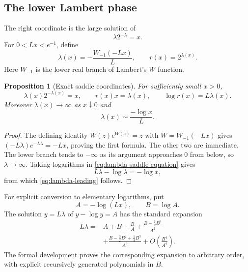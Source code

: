 \documentclass[11pt,oneside]{article}
\newtheorem{proposition}[theorem]{Proposition}
\theoremstyle{definition}
\theoremstyle{remark}
\newcommand{\Lam}{\lambda}
\newcommand{\Ltwo}{L}
\begin{document}
\subsection{The lower Lambert phase}

The right coordinate is the large solution of
\begin{equation}\label{eq:lambda-saddle-equation}
  \Lam 2^{-\Lam}=x.
\end{equation}
For $0<\Ltwo x<e^{-1}$, define
\begin{equation}\label{eq:lambda-W-def}
  \Lam(x)=-\frac{W_{-1}(-\Ltwo x)}{\Ltwo},
  \qquad
  r(x)=2^{\Lam(x)}.
\end{equation}
Here $W_{-1}$ is the lower real branch of Lambert's $W$ function.

\begin{proposition}[Exact saddle coordinates]\label{prop:Lambert-coordinates}
For sufficiently small $x>0$,
\begin{equation}\label{eq:Lambert-identities}
  \Lam(x)2^{-\Lam(x)}=x,
  \qquad r(x)x=\Lam(x),
  \qquad \log r(x)=\Ltwo\Lam(x).
\end{equation}
Moreover $\Lam(x)\to\infty$ as $x\downarrow0$ and
\begin{equation}\label{eq:lambda-leading}
  \Lam(x)\sim\frac{-\log x}{\Ltwo}.
\end{equation}
\end{proposition}

\begin{proof}
The defining identity $W(z)e^{W(z)}=z$ with
$W=W_{-1}(-\Ltwo x)$ gives
$(-\Ltwo\Lam)e^{-\Ltwo\Lam}=-\Ltwo x$, proving the first formula.  The other two
are immediate.  The lower branch tends to $-\infty$ as its argument approaches
$0$ from below, so $\Lam\to\infty$.  Taking logarithms in
\eqref{eq:lambda-saddle-equation} gives
\begin{equation}\label{eq:lambda-log-equation}
  \Ltwo\Lam-\log\Lam=-\log x,
\end{equation}
from which \eqref{eq:lambda-leading} follows.
\end{proof}

For explicit conversion to elementary logarithms, put
\begin{equation}\label{eq:AB-phase}
  A=-\log(\Ltwo x),\qquad B=\log A.
\end{equation}
The solution $y=\Ltwo\Lam$ of $y-\log y=A$ has the standard expansion
\begin{equation}\label{eq:Lambert-phase-expansion}
\begin{split}
 \Ltwo\Lam={}&A+B+\frac BA
 +\frac{B-\tfrac12B^2}{A^2}\\
 &+\frac{B-\tfrac32B^2+\tfrac13B^3}{A^3}
 +O\left(\frac{B^4}{A^4}\right).
\end{split}
\end{equation}
The formal development proves the corresponding expansion to arbitrary order,
with explicit recursively generated polynomials in $B$.
\end{document}
